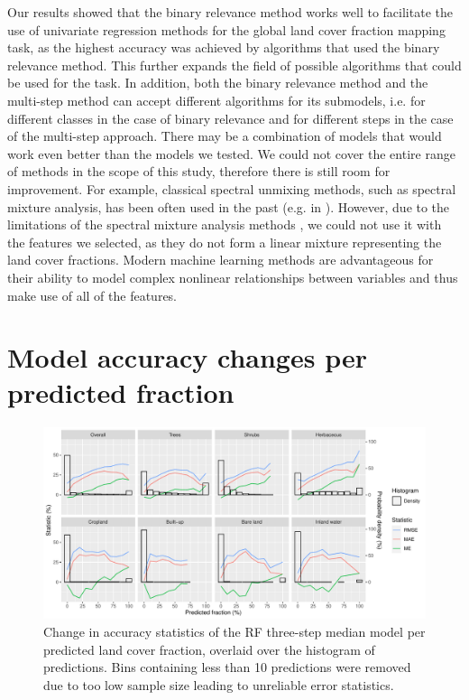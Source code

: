 \documentclass[review,authoryear,3p]{elsarticle}
\begin{document}
Our results showed that the binary relevance method works well to facilitate the use of univariate regression methods for the global land cover fraction mapping task, as the highest accuracy was achieved by algorithms that used the binary relevance method.
This further expands the field of possible algorithms that could be used for the task.
In addition, both the binary relevance method and the multi-step method can accept different algorithms for its submodels, i.e. for different classes in the case of binary relevance and for different steps in the case of the multi-step approach.
There may be a combination of models that would work even better than the models we tested.
We could not cover the entire range of methods in the scope of this study, therefore there is still room for improvement.
For example, classical spectral unmixing methods, such as spectral mixture analysis, has been often used in the past (e.g. in \citet{adams_classification_1995}).
However, due to the limitations of the spectral mixture analysis methods \citep{somers_endmember_2011}, we could not use it with the features we selected, as they do not form a linear mixture representing the land cover fractions.
Modern machine learning methods are advantageous for their ability to model complex nonlinear relationships between variables and thus make use of all of the features.

\section{Model accuracy changes per predicted fraction} \label{sec-apu}

\begin{figure}[h!]
    \centering
    \includegraphics[width=\textwidth]{article-figures/apuplots/2021-01-13-apu-rf3step.pdf}
    \caption{Change in accuracy statistics of the \gls{RF} three-step median model per predicted land cover fraction, overlaid over the histogram of predictions. Bins containing less than 10 predictions were removed due to too low sample size leading to unreliable error statistics.}
    \label{fig-apu}
\end{figure}
\end{document}
